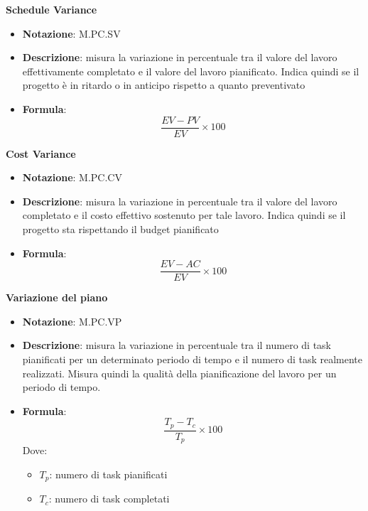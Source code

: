 \textbf{Schedule Variance}
\begin{itemize}
    \item \textbf{Notazione}: M.PC.SV
    \item \textbf{Descrizione}: misura la variazione in percentuale tra il valore del lavoro effettivamente completato e il valore del lavoro pianificato.
    Indica quindi se il progetto è in ritardo o in anticipo rispetto a quanto preventivato
    \item \textbf{Formula}:
    \begin{equation}
        \frac{EV - PV}{EV} \times 100
    \end{equation}
\end{itemize}

\textbf{Cost Variance}
\begin{itemize}
    \item \textbf{Notazione}: M.PC.CV
    \item \textbf{Descrizione}: misura la variazione in percentuale tra il valore del lavoro completato e il costo effettivo sostenuto per tale lavoro.
    Indica quindi se il progetto sta rispettando il budget pianificato
    \item \textbf{Formula}: 
    \begin{equation}
        \frac{EV - AC}{EV} \times 100
    \end{equation}
\end{itemize}

\textbf{Variazione del piano}
\begin{itemize}
    \item \textbf{Notazione}: M.PC.VP
    \item \textbf{Descrizione}: misura la variazione in percentuale tra il numero di task pianificati per un determinato periodo di tempo e il numero di task realmente realizzati.
    Misura quindi la qualità della pianificazione del lavoro per un periodo di tempo.
    \item \textbf{Formula}: 
    \begin{equation}
         \frac{T_p - T_c}{T_p} \times 100
    \end{equation}
    Dove:
    \begin{itemize}
        \item $T_p$: numero di task pianificati
        \item $T_c$: numero di task completati
    \end{itemize}
\end{itemize}

